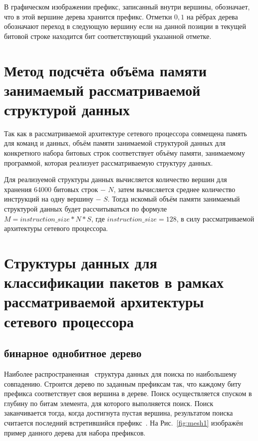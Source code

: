 \documentclass[a4paper, 12pt, titlepage, finall]{extreport}
\begin{document}
        В графическом изображении префикс, записанный внутри вершины, обозначает, что в этой вершине дерева хранится префикс.
        Отметки ${0,1}$ на рёбрах дерева обозначают переход в следующую вершину если на данной позиции в текущей битовой строке находится бит соответствующий указанной отметке.
    
    \section{Метод подсчёта объёма памяти занимаемый рассматриваемой структурой данных}
        Так как в рассматриваемой архитектуре сетевого процессора совмещена память для команд и данных, объём памяти занимаемой структурой данных 
        для конкретного набора битовых строк соответствует объёму памяти, занимаемому программой, которая реализует рассматриваемую структуру данных.

        Для реализуемой структуры данных вычисляется количество вершин для хранения 64000 битовых строк $-$ $N$, затем вычисляется среднее количество инструкций на 
        одну вершину $-$ $S$. Тогда искомый объём памяти занимаемый структурой данных будет рассчитываться по формуле $M = instruction\_size * N * S$,
        где $instruction\_size = 128$, в силу рассматриваемой архитектуры сетевого процессора.

    \section{Структуры данных для классификации пакетов в рамках рассматриваемой архитектуры сетевого процессора}
        \subsection{бинарное однобитное дерево}
            Наиболее распространенная~\cite{behdadfar2009scalar} структура данных для поиска по наибольшему совпадению. 
            Строится дерево по заданным префиксам так, что каждому биту префикса соответствует своя вершина в дереве. 
            Поиск осуществляется спуском в глубину по битам элемента, для которого выполняется поиск. 
            Поиск заканчивается тогда, когда достигнута пустая вершина, результатом поиска считается последний встретившийся префикс~\cite{chao2007high:1}.
            На Рис.~\ref{fig:mesh1} изображён пример данного дерева для набора префиксов.
\end{document}
